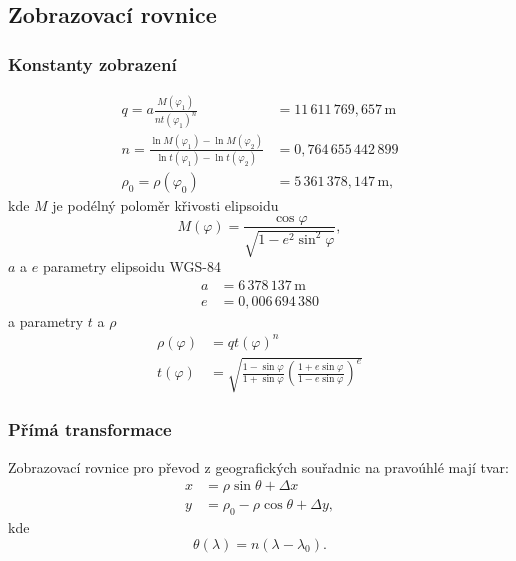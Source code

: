 \documentclass[a4paper]{article}
\begin{document}
\subsection{Zobrazovací rovnice}
\subsubsection{Konstanty zobrazení}
\begin{align*}
q = a \frac{M(\varphi_1)}{n t(\varphi_1)^n} &= 11\,611\,769,657\,\mathrm{m}\\
n = \frac{\ln{M(\varphi_1)} - \ln{M(\varphi_2)}}{\ln{t(\varphi_1)} - \ln{t(\varphi_2)}} &= 0,764\,655\,442\,899\\
\rho_0 = \rho(\varphi_0) &= 5\,361\,378,147\,\mathrm{m},
\end{align*}
kde $M$ je podélný poloměr křivosti elipsoidu
\begin{equation*}
M(\varphi) = \frac{\cos{\varphi}}{\sqrt{1 - e^2 \sin^2{\varphi}}},
\end{equation*}
$a$ a $e$ parametry elipsoidu WGS-84
\begin{align*}
a &= 6\,378\,137\,\mathrm{m}\\
e &= 0,006\,694\,380
\end{align*}
a parametry $t$ a $\rho$
\begin{align*}
\rho(\varphi) &= q t(\varphi)^n\\
t(\varphi) &= \sqrt{\frac{1-\sin{\varphi}}{1+\sin{\varphi}}\left(\frac{1+e\sin{\varphi}}{1-e\sin{\varphi}}\right)^e}
\end{align*}

\subsubsection{Přímá transformace}
Zobrazovací rovnice pro převod z geografických souřadnic na pravoúhlé mají tvar:
\begin{align*}
x &= \rho \sin{\theta} + \Delta x\\
y &= \rho_0 - \rho \cos{\theta} + \Delta y,
\end{align*}
kde
\begin{equation*}
\theta(\lambda) = n (\lambda - \lambda_0).
\end{equation*}
  
\end{document}
